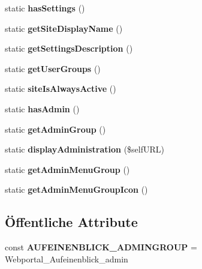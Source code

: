 \begin{DoxyCompactItemize}
static {\bfseries has\+Settings} ()
\item 
\mbox{\label{classaufeinenblick_a71119a42644656b95a97696a412bda49}} 
static {\bfseries get\+Site\+Display\+Name} ()
\item 
\mbox{\label{classaufeinenblick_a1fbd29b172944c505404512c55690858}} 
static {\bfseries get\+Settings\+Description} ()
\item 
\mbox{\label{classaufeinenblick_a151d08f74950bbc90a39d108fd600c1f}} 
static {\bfseries get\+User\+Groups} ()
\item 
\mbox{\label{classaufeinenblick_aececd09890c2f1d215b439a3025f6780}} 
static {\bfseries site\+Is\+Always\+Active} ()
\item 
\mbox{\label{classaufeinenblick_a67e294e8d9b71f075f6666e60139d1cd}} 
static {\bfseries has\+Admin} ()
\item 
\mbox{\label{classaufeinenblick_a34bfb82e7077942dcfbbf6c27371ce1b}} 
static {\bfseries get\+Admin\+Group} ()
\item 
\mbox{\label{classaufeinenblick_af209c1fcd38bfe2a89052d0261560d5a}} 
static {\bfseries display\+Administration} (\$self\+U\+RL)
\item 
\mbox{\label{classaufeinenblick_aadecd4efdadd220379ec667d74feccee}} 
static {\bfseries get\+Admin\+Menu\+Group} ()
\item 
\mbox{\label{classaufeinenblick_a08f7e0754e21ae874cb19f640bfcb15b}} 
static {\bfseries get\+Admin\+Menu\+Group\+Icon} ()
\end{DoxyCompactItemize}
\subsection*{Öffentliche Attribute}
\begin{DoxyCompactItemize}
\item 
\mbox{\label{classaufeinenblick_a15c8244797d7a363214d10c4475b0467}} 
const {\bfseries A\+U\+F\+E\+I\+N\+E\+N\+B\+L\+I\+C\+K\+\_\+\+A\+D\+M\+I\+N\+G\+R\+O\+UP} = \textquotesingle{}Webportal\+\_\+\+Aufeinenblick\+\_\+admin\textquotesingle{}
\end{DoxyCompactItemize}
